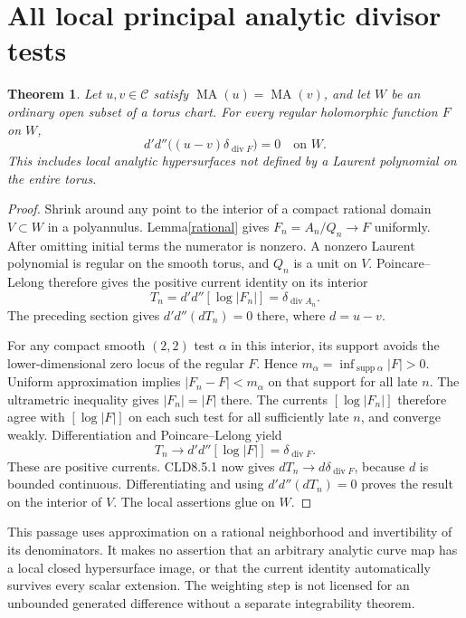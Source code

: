 \documentclass[11pt]{article}
\newtheorem{theorem}{Theorem}
\newcommand{\DD}{d'd''}
\newcommand{\MA}{\operatorname{MA}}
\begin{document}
\section{All local principal analytic divisor tests}
\begin{theorem}\label{localdiv}
Let $u,v\in\mathcal C$ satisfy $\MA(u)=\MA(v)$, and let $W$ be an
ordinary open subset of a torus chart. For every regular holomorphic
function $F$ on $W$,
\[
 \DD\bigl((u-v)\delta_{\operatorname{div}F}\bigr)=0
                      \quad\text{on }W.
\]
This includes local analytic hypersurfaces not defined by a Laurent
polynomial on the entire torus.
\end{theorem}
\begin{proof}
Shrink around any point to the interior of a compact rational domain
$V\subset W$ in a polyannulus. Lemma\ref{rational} gives
$F_n=A_n/Q_n\to F$ uniformly. After omitting initial terms the numerator
is nonzero. A nonzero Laurent polynomial is regular on the smooth
torus, and $Q_n$ is a unit on $V$. Poincare--Lelong therefore gives the
positive current identity on its interior
\[
 T_n=\DD[\log|F_n|]
       =\delta_{\operatorname{div}A_n}.
\]
The preceding section gives $\DD(dT_n)=0$ there, where $d=u-v$.

For any compact smooth $(2,2)$ test $\alpha$ in this interior, its
support avoids the lower-dimensional zero locus of the regular $F$.
Hence $m_\alpha=\inf_{\operatorname{supp}\alpha}|F|>0$. Uniform
approximation implies $|F_n-F|<m_\alpha$ on that support for all late
$n$. The ultrametric inequality gives $|F_n|=|F|$ there. The currents
$[\log|F_n|]$ therefore agree with $[\log|F|]$ on each such test for
all sufficiently late $n$, and converge weakly. Differentiation and
Poincare--Lelong yield
\[
 T_n\longrightarrow\DD[\log|F|]
                          =\delta_{\operatorname{div}F}.
\]
These are positive currents. CLD8.5.1 now gives
$dT_n\to d\delta_{\operatorname{div}F}$, because $d$ is bounded
continuous. Differentiating and using $\DD(dT_n)=0$ proves the result
on the interior of $V$. The local assertions glue on $W$.
\end{proof}
This passage uses approximation on a rational neighborhood and
invertibility of its denominators. It makes no assertion that an
arbitrary analytic curve map has a local closed hypersurface image,
or that the current identity automatically survives every scalar
extension. The weighting step is not licensed for an unbounded
generated difference without a separate integrability theorem.
\end{document}
